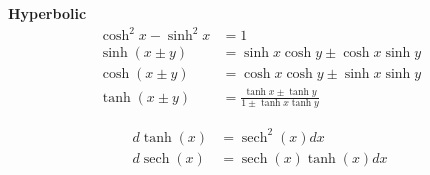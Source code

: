 \documentclass[twocolumn]{article}
\DeclareMathOperator{\sech}{sech}
\theoremstyle{definition}
\begin{document}
\textbf{Hyperbolic}
\begin{align*}
\cosh^2 x - \sinh^2 x &= 1 \\
\sinh(x \pm y) &= \sinh x \cosh y \pm \cosh x \sinh y \\
\cosh(x \pm y) &= \cosh x \cosh y \pm \sinh x \sinh y \\
\tanh(x \pm y) &= \frac{\tanh x \pm \tanh y}{1 \pm \tanh x \tanh y}
\end{align*}

\begin{align*}
	d \tanh(x) &= \sech^2(x) dx\\
	d \sech(x) &= \sech(x)\tanh(x) dx\\
\end{align*}
\end{document}
